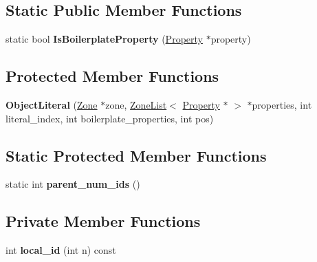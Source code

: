 \subsection*{Static Public Member Functions}
\begin{DoxyCompactItemize}
\item 
static bool {\bfseries Is\+Boilerplate\+Property} (\hyperlink{classv8_1_1internal_1_1_object_literal_property}{Property} $\ast$property)\hypertarget{classv8_1_1internal_1_1_object_literal_abad5bc6427993ada2139ba93b8d8865a}{}\label{classv8_1_1internal_1_1_object_literal_abad5bc6427993ada2139ba93b8d8865a}

\end{DoxyCompactItemize}
\subsection*{Protected Member Functions}
\begin{DoxyCompactItemize}
\item 
{\bfseries Object\+Literal} (\hyperlink{classv8_1_1internal_1_1_zone}{Zone} $\ast$zone, \hyperlink{classv8_1_1internal_1_1_zone_list}{Zone\+List}$<$ \hyperlink{classv8_1_1internal_1_1_object_literal_property}{Property} $\ast$ $>$ $\ast$properties, int literal\+\_\+index, int boilerplate\+\_\+properties, int pos)\hypertarget{classv8_1_1internal_1_1_object_literal_a2374ad02d24f47da8a50cd1b3147991a}{}\label{classv8_1_1internal_1_1_object_literal_a2374ad02d24f47da8a50cd1b3147991a}

\end{DoxyCompactItemize}
\subsection*{Static Protected Member Functions}
\begin{DoxyCompactItemize}
\item 
static int {\bfseries parent\+\_\+num\+\_\+ids} ()\hypertarget{classv8_1_1internal_1_1_object_literal_ae90fbb10ab56f02a647f3bbb727f711a}{}\label{classv8_1_1internal_1_1_object_literal_ae90fbb10ab56f02a647f3bbb727f711a}

\end{DoxyCompactItemize}
\subsection*{Private Member Functions}
\begin{DoxyCompactItemize}
\item 
int {\bfseries local\+\_\+id} (int n) const \hypertarget{classv8_1_1internal_1_1_object_literal_ab6408f99b4bef4e3ff837e4c71d106c3}{}\label{classv8_1_1internal_1_1_object_literal_ab6408f99b4bef4e3ff837e4c71d106c3}

\end{DoxyCompactItemize}
